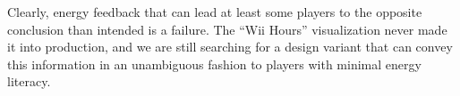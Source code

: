 \documentclass[10pt, conference, compsocconf]{IEEEtran}
\begin{document}
Clearly, energy feedback that can lead at least some players to the opposite conclusion than intended is a failure. The ``Wii Hours'' visualization never made it into production, and we are still searching for a design variant that can convey this information in an unambiguous fashion to players with minimal energy literacy.


%
%
%
%
%
\end{document}
